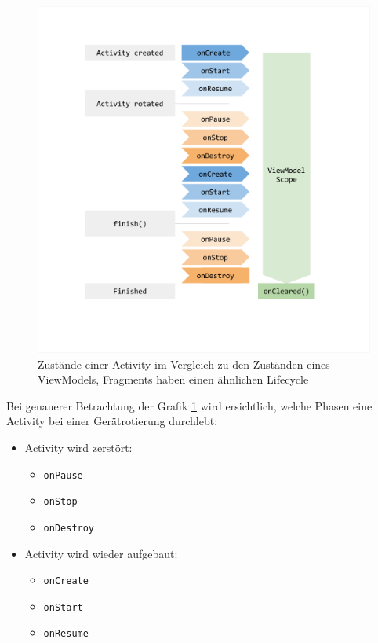 \begin{figure}
  \includegraphics[width=\linewidth]{viewmodel-lifecycle.png}
  \caption{Zustände einer Activity im Vergleich zu den Zuständen eines ViewModels, Fragments haben einen ähnlichen Lifecycle \cite{fragment-lifecycle} \cite{viewmodel}}
  \label{fig:vmlife}
\end{figure}

Bei genauerer Betrachtung der Grafik \ref{fig:vmlife} wird ersichtlich,
welche Phasen eine Activity bei einer Gerätrotierung durchlebt:

\begin{itemize}
\tightlist
\item
  Activity wird zerstört:

  \begin{itemize}
  \tightlist
  \item
    \texttt{onPause}
  \item
    \texttt{onStop}
  \item
    \texttt{onDestroy}
  \end{itemize}
\item
  Activity wird wieder aufgebaut:

  \begin{itemize}
  \tightlist
  \item
    \texttt{onCreate}
  \item
    \texttt{onStart}
  \item
    \texttt{onResume}
  \end{itemize}
\end{itemize}

